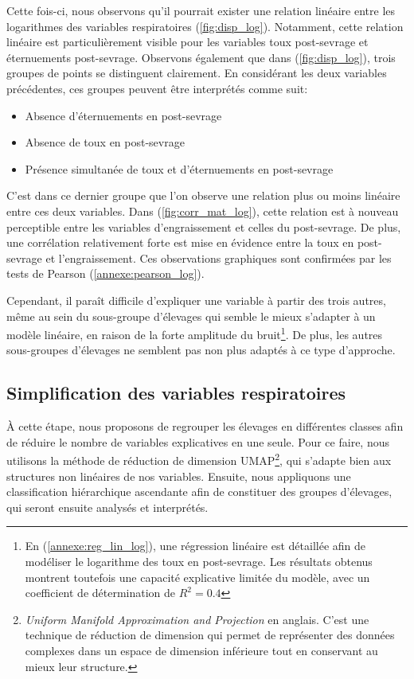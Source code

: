 \documentclass{article}
\begin{document}
Cette fois-ci, nous observons qu'il pourrait exister une relation linéaire entre les logarithmes des variables respiratoires (\ref{fig:disp_log}). Notamment, cette relation linéaire est particulièrement visible pour les variables toux post-sevrage et éternuements post-sevrage.
Observons également que dans (\ref{fig:disp_log}), trois groupes de points se distinguent clairement. En considérant les deux variables précédentes, ces groupes peuvent être interprétés comme suit:
\vspace{0.25cm}
\begin{itemize}
\item Absence d’éternuements en post-sevrage
\item Absence de toux en post-sevrage
\item Présence simultanée de toux et d’éternuements en post-sevrage
\end{itemize}
\vspace{0.25cm}
C’est dans ce dernier groupe que l'on observe une relation plus ou moins linéaire entre ces deux variables.
Dans (\ref{fig:corr_mat_log}), cette relation est à nouveau perceptible entre les variables d'engraissement et celles du post-sevrage. De plus, une corrélation relativement forte est mise en évidence entre la toux en post-sevrage et l’engraissement.
Ces observations graphiques sont confirmées par les tests de Pearson (\ref{annexe:pearson_log}).

Cependant, il paraît difficile d’expliquer une variable à partir des trois autres, même au sein du sous-groupe d’élevages qui semble le mieux s’adapter à un modèle linéaire, en raison de la forte amplitude du bruit\footnote{En (\ref{annexe:reg_lin_log}), une régression linéaire est détaillée afin de modéliser le logarithme des toux en post-sevrage. Les résultats obtenus montrent toutefois une capacité explicative limitée du modèle, avec un coefficient de détermination de  $R^2=0.4$}. De plus, les autres sous-groupes d’élevages ne semblent pas non plus adaptés à ce type d’approche.

\subsection{Simplification des variables respiratoires}
À cette étape, nous proposons de regrouper les élevages en différentes classes afin de réduire le nombre de variables explicatives en une seule. Pour ce faire, nous utilisons la méthode de réduction de dimension UMAP\footnote{\textit{Uniform Manifold Approximation and Projection} en anglais. C’est une technique de réduction de dimension qui permet de représenter des données complexes dans un espace de dimension inférieure tout en conservant au mieux leur structure.}, qui s’adapte bien aux structures non linéaires de nos variables. Ensuite, nous appliquons une classification hiérarchique ascendante afin de constituer des groupes d’élevages, qui seront ensuite analysés et interprétés.
\end{document}
